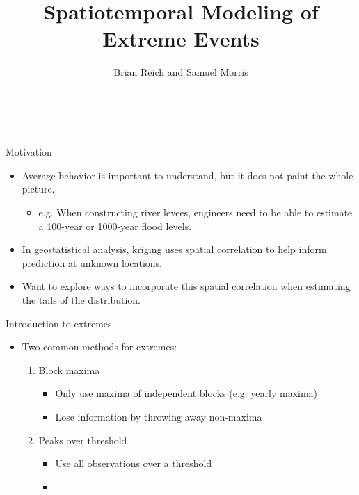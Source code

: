 \documentclass[t]{beamer}
\title[Spatiotemporal Modeling of Extreme Events] %
{
  Spatiotemporal Modeling of Extreme Events
}
\author[B. Reich and S. Morris]{Brian Reich and Samuel Morris}
\institute[NCSU]{North Carolina State University}
\date{}
\begin{document}
\begin{frame}\frametitle{\ }
\begin{center}
	\maketitle
\end{center}
\end{frame}

\begin{frame}{Motivation}
  \begin{itemize}
    \item Average behavior is important to understand, but it does not paint the whole picture.
    \begin{itemize}
      \item e.g. When constructing river levees, engineers need to be able to estimate a 100-year or 1000-year flood levels.
    \end{itemize}
    \item In geostatistical analysis, kriging uses spatial correlation to help inform prediction at unknown locations.
    \item Want to explore ways to incorporate this spatial correlation when estimating the tails of the distribution.
  \end{itemize}
\end{frame}

\begin{frame}{Introduction to extremes}
  \begin{itemize} \itemsep 1.5em
  \item Two common methods for extremes:
  \begin{enumerate}[1]
    \item Block maxima
    \begin{itemize}
      \item Only use maxima of independent blocks (e.g. yearly maxima)
      \item Lose information by throwing away non-maxima
    \end{itemize}
    \item Peaks over threshold
    \begin{itemize}
      \item Use all observations over a threshold
      \item
    \end{itemize}
  \end{enumerate}

  \end{itemize}
\end{frame}
\end{document}
